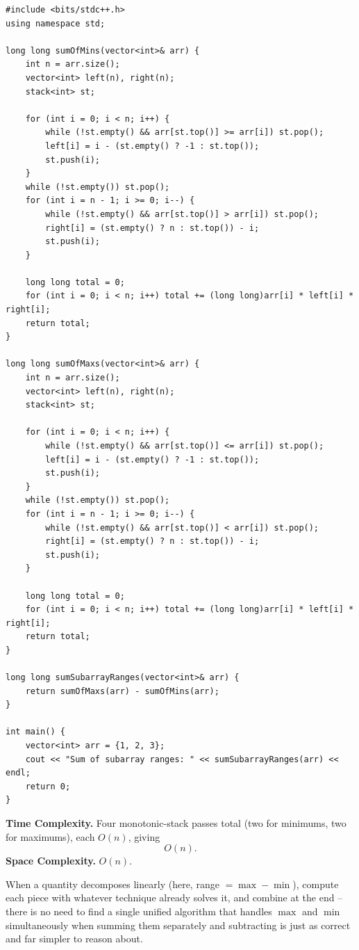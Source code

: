 \begin{lstlisting}
#include <bits/stdc++.h>
using namespace std;

long long sumOfMins(vector<int>& arr) {
    int n = arr.size();
    vector<int> left(n), right(n);
    stack<int> st;

    for (int i = 0; i < n; i++) {
        while (!st.empty() && arr[st.top()] >= arr[i]) st.pop();
        left[i] = i - (st.empty() ? -1 : st.top());
        st.push(i);
    }
    while (!st.empty()) st.pop();
    for (int i = n - 1; i >= 0; i--) {
        while (!st.empty() && arr[st.top()] > arr[i]) st.pop();
        right[i] = (st.empty() ? n : st.top()) - i;
        st.push(i);
    }

    long long total = 0;
    for (int i = 0; i < n; i++) total += (long long)arr[i] * left[i] * right[i];
    return total;
}

long long sumOfMaxs(vector<int>& arr) {
    int n = arr.size();
    vector<int> left(n), right(n);
    stack<int> st;

    for (int i = 0; i < n; i++) {
        while (!st.empty() && arr[st.top()] <= arr[i]) st.pop();
        left[i] = i - (st.empty() ? -1 : st.top());
        st.push(i);
    }
    while (!st.empty()) st.pop();
    for (int i = n - 1; i >= 0; i--) {
        while (!st.empty() && arr[st.top()] < arr[i]) st.pop();
        right[i] = (st.empty() ? n : st.top()) - i;
        st.push(i);
    }

    long long total = 0;
    for (int i = 0; i < n; i++) total += (long long)arr[i] * left[i] * right[i];
    return total;
}

long long sumSubarrayRanges(vector<int>& arr) {
    return sumOfMaxs(arr) - sumOfMins(arr);
}

int main() {
    vector<int> arr = {1, 2, 3};
    cout << "Sum of subarray ranges: " << sumSubarrayRanges(arr) << endl;
    return 0;
}
\end{lstlisting}

\begin{complexitybox}
\textbf{Time Complexity.} Four monotonic-stack passes total (two for
minimums, two for maximums), each $O(n)$, giving
\[
  O(n).
\]
\textbf{Space Complexity.} $O(n)$.
\end{complexitybox}

\begin{takeawaybox}
When a quantity decomposes linearly (here, range $= \max - \min$),
compute each piece with whatever technique already solves it, and combine
at the end -- there is no need to find a single unified algorithm that
handles $\max$ and $\min$ simultaneously when summing them separately and
subtracting is just as correct and far simpler to reason about.
\end{takeawaybox}
